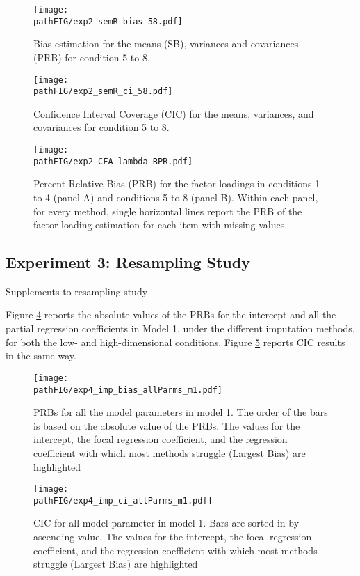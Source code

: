\documentclass[]{./cls/interact}
\theoremstyle{plain}
\theoremstyle{definition}
\theoremstyle{remark}
\newcommand{\pathFIG}{./figures}
\begin{document}
\begin{figure}
	\centering
	\texttt{[image: \\pathFIG/exp2\_semR\_bias\_58.pdf]}
	\caption{Bias estimation for the means (SB), variances and covariances (PRB) for condition 5 
			to 8.}
	\label{fig:exp2bias58}
\end{figure}

\begin{figure}
	\centering
	\texttt{[image: \\pathFIG/exp2\_semR\_ci\_58.pdf]}
	\caption{Confidence Interval Coverage (CIC) for the means, variances, and covariances 
			for condition 5 to 8.}
	\label{fig:exp2cir58}
\end{figure}

\begin{figure}
	\texttt{[image: \\pathFIG/exp2\_CFA\_lambda\_BPR.pdf]}
	\caption{
		Percent Relative Bias (PRB) for the factor loadings in conditions 1 to 4 (panel A) 
		and conditions 5 to 8 (panel B).
		Within each panel, for every method, single horizontal lines report the PRB of the 
		factor loading estimation for each item with missing values.
		}
\label{fig:exp2flAll}
\end{figure}

\FloatBarrier

\subsection{Experiment 3: Resampling Study}

Supplements to resampling study

	Figure \ref{fig:exp4bias_m1} reports the absolute values of the PRBs for the intercept and all the partial 
	regression coefficients in Model 1, under the different imputation methods, for both the low- and high-dimensional
	conditions.
	Figure \ref{fig:exp4cir_m1} reports CIC results in the same way.

\begin{figure}
	\centering
	\texttt{[image: \\pathFIG/exp4\_imp\_bias\_allParms\_m1.pdf]}
	\caption{PRBs for all the model parameters in model 1. 
		The order of the bars is based on the absolute value of the PRBs.
		The values for the intercept, the focal regression coefficient, and the regression coefficient with which most 
		methods struggle (Largest Bias) are highlighted}
	\label{fig:exp4bias_m1}
\end{figure}

\begin{figure}
	\centering
	\texttt{[image: \\pathFIG/exp4\_imp\_ci\_allParms\_m1.pdf]}
	\caption{CIC for all model parameter in model 1.
		Bars are sorted in by ascending value.
		The values for the intercept, the focal regression coefficient, and the regression coefficient with which most 
		methods struggle (Largest Bias) are highlighted}
	\label{fig:exp4cir_m1}
\end{figure}
\end{document}
